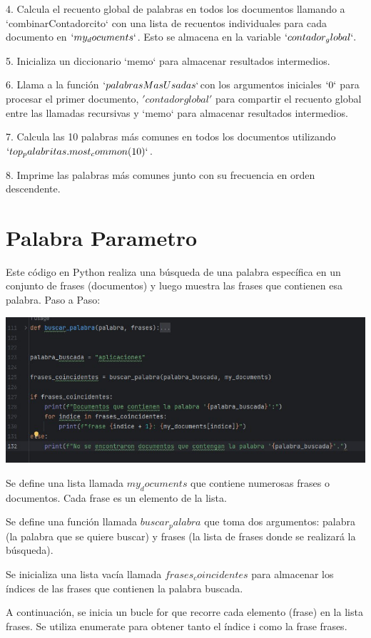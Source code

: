 \documentclass[a4paper,twocolumn,10pt]{article}
\begin{document}
4. Calcula el recuento global de palabras en todos los documentos llamando a `combinarContadorcito` con una lista de recuentos individuales para cada documento en $`my_documents`$. Esto se almacena en la variable $`contador_global`.$

5. Inicializa un diccionario `memo` para almacenar resultados intermedios.

6. Llama a la función $`palabrasMasUsadas`$con los argumentos iniciales $`0`$ para procesar el primer documento, $'contador global'$ para compartir el recuento global entre las llamadas recursivas y `memo` para almacenar resultados intermedios.

7. Calcula las 10 palabras más comunes en todos los documentos utilizando $`top_palabritas.most_common(10)`$.

8. Imprime las palabras más comunes junto con su frecuencia en orden descendente.

\section{Palabra Parametro }

Este código en Python realiza una búsqueda de una palabra específica en un conjunto de frases (documentos) y luego muestra las frases que contienen esa palabra. Paso a Paso:

\includegraphics[width=0.8\linewidth]{imagenes/segundo codigo.jpg}


Se define una lista llamada $my_documents$ que contiene numerosas frases o documentos. Cada frase es un elemento de la lista.

Se define una función llamada $buscar_palabra$ que toma dos argumentos: palabra (la palabra que se quiere buscar) y frases (la lista de frases donde se realizará la búsqueda).

Se inicializa una lista vacía llamada $frases_coincidentes$ para almacenar los índices de las frases que contienen la palabra buscada.

A continuación, se inicia un bucle for que recorre cada elemento (frase) en la lista frases. Se utiliza enumerate para obtener tanto el índice i como la frase frases.
\end{document}
